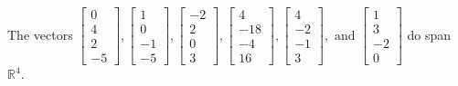 \begin{exercise}
\begin{exerciseStatement}
  \end{exerciseStatement}
  \begin{exerciseAnswer}
   The vectors \(\left[\begin{array}{r}
0 \\
4 \\
2 \\
-5
\end{array}\right] , \left[\begin{array}{r}
1 \\
0 \\
-1 \\
-5
\end{array}\right] , \left[\begin{array}{r}
-2 \\
2 \\
0 \\
3
\end{array}\right] , \left[\begin{array}{r}
4 \\
-18 \\
-4 \\
16
\end{array}\right] , \left[\begin{array}{r}
4 \\
-2 \\
-1 \\
3
\end{array}\right] , \text{ and } \left[\begin{array}{r}
1 \\
3 \\
-2 \\
0
\end{array}\right]\) 
  	 do  
	span \(\mathbb{R}^4\).
  


  \end{exerciseAnswer}
\end{exercise}